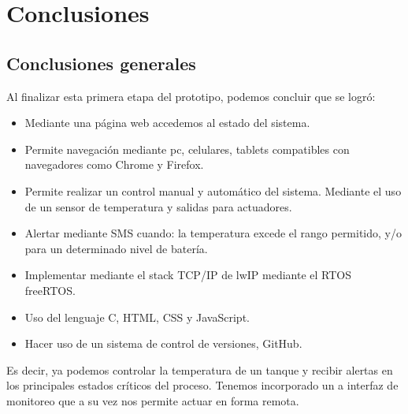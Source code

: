 
\chapter{Conclusiones} %

\label{Chapter5} %




\section{Conclusiones generales }


Al finalizar esta primera etapa del prototipo, podemos concluir que se logró:
  \begin{itemize}
    \item Mediante una página web accedemos al estado del sistema.
    \item Permite navegación mediante pc, celulares, tablets compatibles con navegadores como Chrome y Firefox.
    \item Permite realizar un control manual y automático del sistema. Mediante el uso de un sensor de temperatura y salidas para actuadores. 
    \item Alertar mediante SMS cuando: la temperatura excede el rango permitido, y/o para un determinado nivel de batería.
    \item Implementar mediante el stack TCP/IP de lwIP mediante el RTOS freeRTOS. 
    \item Uso del lenguaje C, HTML, CSS y JavaScript. 
    \item Hacer uso de un sistema de control de versiones, GitHub. 
   \end{itemize} 

Es decir, ya podemos controlar la temperatura de un tanque y recibir alertas en los principales estados críticos del proceso. Tenemos incorporado un a interfaz de monitoreo que a su vez nos permite actuar en forma remota.  



